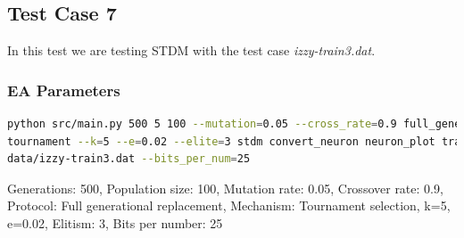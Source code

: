 \subsection{Test Case 7}\label{sec:test-case-7}
In this test we are testing STDM with the test case
\textit{izzy-train3.dat}.
\subsubsection{EA Parameters}\label{sec:test-case-7-parameters}
\begin{lstlisting}[frame=single, language=bash, caption=Command-line to
replicate the results]
python src/main.py 500 5 100 --mutation=0.05 --cross_rate=0.9 full_generational
tournament --k=5 --e=0.02 --elite=3 stdm convert_neuron neuron_plot training\
data/izzy-train3.dat --bits_per_num=25
\end{lstlisting}
Generations: 500, Population size: 100, Mutation rate: 0.05, Crossover rate: 0.9, Protocol: Full generational replacement, Mechanism: Tournament selection, k=5, e=0.02, Elitism: 3, Bits per number: 25
